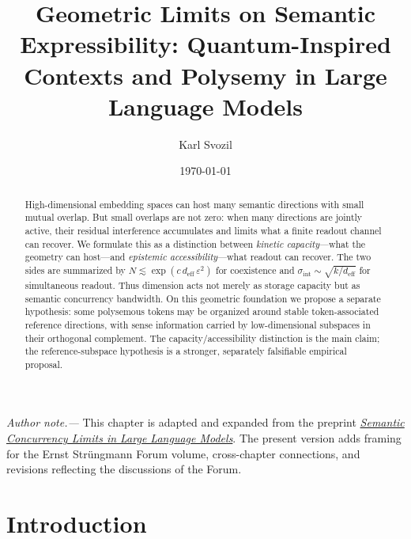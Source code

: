 \documentclass[
  aps,
  reprint,
  superscriptaddress,
  floatfix,
  nofootinbib,
  longbibliography
]{revtex4-2}
\newcommand{\deff}{d_{\mathrm{eff}}}
\newcommand{\sint}{\sigma_{\mathrm{int}}}
\begin{document}
\title{Geometric Limits on Semantic Expressibility: Quantum-Inspired Contexts and Polysemy in Large Language Models}

\author{Karl Svozil}

\date{\today}

\begin{abstract}
High-dimensional embedding spaces can host many semantic directions
with small mutual overlap. But small overlaps are not zero: when many
directions are jointly active, their residual interference accumulates
and limits what a finite readout channel can recover. We formulate this
as a distinction between \emph{kinetic capacity}---what the geometry
can host---and \emph{epistemic accessibility}---what readout can
recover. The two sides are summarized by
$N\lesssim\exp(c\,\deff\,\varepsilon^{2})$ for coexistence and
$\sint\sim\sqrt{k/\deff}$ for simultaneous readout. Thus dimension acts
not merely as storage capacity but as semantic concurrency bandwidth.
On this geometric foundation we propose a separate hypothesis: some
polysemous tokens may be organized around stable token-associated
reference directions, with sense information carried by low-dimensional
subspaces in their orthogonal complement. The capacity/accessibility
distinction is the main claim; the reference-subspace hypothesis is a stronger,
separately falsifiable empirical proposal.
\end{abstract}

\maketitle

\noindent\textit{Author note.---}
This chapter is adapted and expanded from the preprint
\href{https://doi.org/10.48550/arXiv.2504.13824}{\textit{Semantic
Concurrency Limits in Large Language Models}}.  The present version adds
framing for the Ernst Str\"ungmann Forum volume, cross-chapter connections,
and revisions reflecting the discussions of the Forum.

\section{Introduction}
\label{sec:intro}
\end{document}
